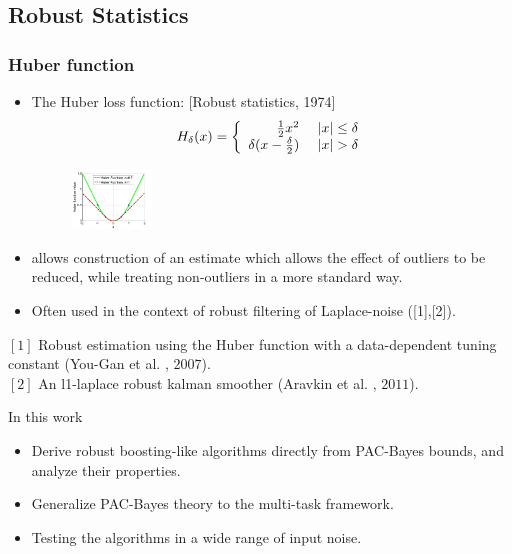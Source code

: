 \documentclass[mathserif]{beamer}
\begin{document}
\subsection{Robust Statistics}
\begin{frame}
\frametitle{ Huber function }
\begin{itemize}
\item The Huber loss function: [Robust statistics, 1974]
\begin{align*}
 H_{\delta}(x) = \left\{ \begin{array}{rl}
 \frac{1}{2} x^2 &\mbox{  $\left\vert{x}\right\vert\leq\delta$} \\
  \delta(x-\frac{\delta}{2}) &\mbox{ $\left\vert{x}\right\vert>\delta$}
       \end{array} \right.
 \end{align*}
 \begin{figure}
  \begin{center}
    \includegraphics[width=0.2\textwidth]{figs/huber_loss}
  \end{center}
\end{figure}
\item allows construction of an estimate which allows the effect of outliers to be reduced, while treating non-outliers in a more standard way.
\item Often used in the context of robust filtering of Laplace-noise ([1],[2]).
\end{itemize}
$[1]$ Robust estimation using the Huber function with a
data-dependent tuning constant (You-Gan et al. , $2007$).\\
$[2]$ An l1-laplace robust kalman smoother (Aravkin et al. , $2011$). \\
\begin{block}{In this work} 
\begin{itemize}
\item Derive robust boosting-like algorithms directly from PAC-Bayes bounds, and analyze their properties.
\item Generalize PAC-Bayes theory to the multi-task framework. 
\item Testing the algorithms in a wide range of input noise.
\end{itemize}
\end{block}
\end{frame}
\end{document}
